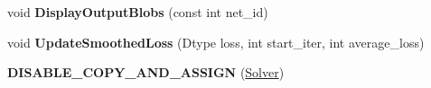 \begin{DoxyCompactItemize}
\item 
void {\bfseries Display\+Output\+Blobs} (const int net\+\_\+id)\hypertarget{classcaffe_1_1Solver_a321a24e0422c6f95895f57ed9732192a}{}\label{classcaffe_1_1Solver_a321a24e0422c6f95895f57ed9732192a}

\item 
void {\bfseries Update\+Smoothed\+Loss} (Dtype loss, int start\+\_\+iter, int average\+\_\+loss)\hypertarget{classcaffe_1_1Solver_af38477c3d0e124de6eb989629cc4f62f}{}\label{classcaffe_1_1Solver_af38477c3d0e124de6eb989629cc4f62f}

\item 
{\bfseries D\+I\+S\+A\+B\+L\+E\+\_\+\+C\+O\+P\+Y\+\_\+\+A\+N\+D\+\_\+\+A\+S\+S\+I\+GN} (\hyperlink{classcaffe_1_1Solver}{Solver})\hypertarget{classcaffe_1_1Solver_a3d7a623b6aa51f7971942d376652924f}{}\label{classcaffe_1_1Solver_a3d7a623b6aa51f7971942d376652924f}

\end{DoxyCompactItemize}
